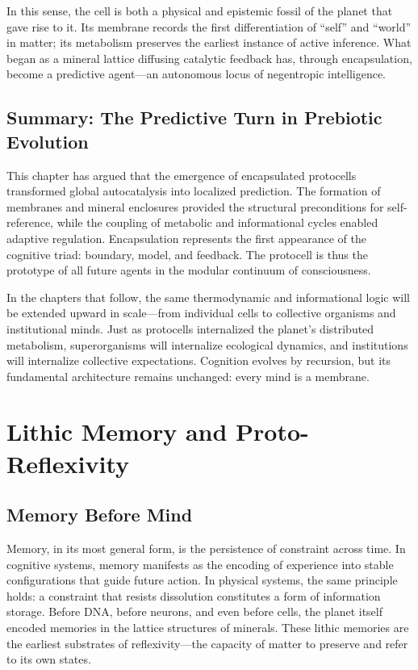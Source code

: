 \documentclass[11pt,a4paper]{article}
\begin{document}
In this sense, the cell is both a physical and epistemic fossil of the planet that gave rise to it.  Its membrane records the first differentiation of ``self'' and ``world'' in matter; its metabolism preserves the earliest instance of active inference.  What began as a mineral lattice diffusing catalytic feedback has, through encapsulation, become a predictive agent—an autonomous locus of negentropic intelligence.

\subsection{Summary: The Predictive Turn in Prebiotic Evolution}

This chapter has argued that the emergence of encapsulated protocells transformed global autocatalysis into localized prediction.  The formation of membranes and mineral enclosures provided the structural preconditions for self-reference, while the coupling of metabolic and informational cycles enabled adaptive regulation.  Encapsulation represents the first appearance of the cognitive triad: boundary, model, and feedback.  The protocell is thus the prototype of all future agents in the modular continuum of consciousness.

In the chapters that follow, the same thermodynamic and informational logic will be extended upward in scale—from individual cells to collective organisms and institutional minds.  Just as protocells internalized the planet’s distributed metabolism, superorganisms will internalize ecological dynamics, and institutions will internalize collective expectations.  Cognition evolves by recursion, but its fundamental architecture remains unchanged: every mind is a membrane.


\section{Lithic Memory and Proto-Reflexivity}
\label{sec:lithic-memory}

\subsection{Memory Before Mind}

Memory, in its most general form, is the persistence of constraint across time.  In cognitive systems, memory manifests as the encoding of experience into stable configurations that guide future action.  In physical systems, the same principle holds: a constraint that resists dissolution constitutes a form of information storage.  Before DNA, before neurons, and even before cells, the planet itself encoded memories in the lattice structures of minerals.  These lithic memories are the earliest substrates of reflexivity—the capacity of matter to preserve and refer to its own states.
\end{document}
